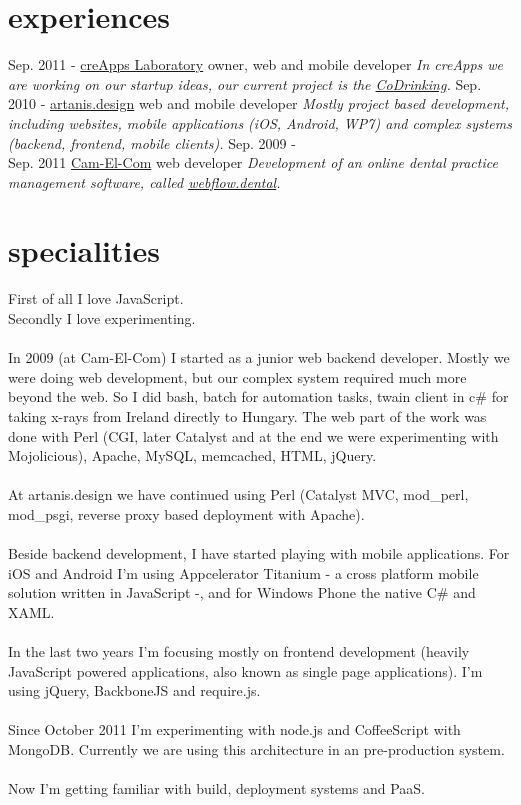 \documentclass[]{k-cv}
\begin{document}
\section{experiences}

\begin{entrylist}
	\entry
		{Sep. 2011 - }
		{\href{http://creapps.net}{creApps Laboratory}}
		{owner, web and mobile developer}
		{\emph{In creApps we are working on our startup ideas, our current project is the \href{http://codrinking.net}{CoDrinking}.}}
	\entry
		{Sep. 2010 - }
		{\href{http://artanisdesign.eu/}{artanis.design}}
		{web and mobile developer}
		{\emph{Mostly project based development, including websites, mobile applications (iOS, Android, WP7) and complex systems (backend, frontend, mobile clients).}}
	\entry
		{Sep. 2009 -\\ Sep. 2011}
		{\href{http://camelcom.hu}{Cam-El-Com}}
		{web developer}
		{\emph{Development of an online dental practice management software, called \href{http://webflow-dental.com/}{webflow.dental}.}}
\end{entrylist}

\section{specialities}
First of all I love JavaScript.\\
Secondly I love experimenting.\\
\\
In 2009 (at Cam-El-Com) I started as a junior web backend developer. Mostly we were doing web development, but our complex system required much more beyond the web. So I did bash, batch for automation tasks, twain client in c\# for taking x-rays from Ireland directly to Hungary. The web part of the work was done with Perl (CGI, later Catalyst and at the end we were experimenting with Mojolicious), Apache, MySQL, memcached, HTML, jQuery.\\
\\
At artanis.design we have continued using Perl (Catalyst MVC, mod\_perl, mod\_psgi, reverse proxy based deployment with Apache).\\
\\
Beside backend development, I have started playing with mobile applications. For iOS and Android I'm using Appcelerator Titanium - a cross platform mobile solution written in JavaScript -, and for Windows Phone the native C\# and XAML.\\
\\
In the last two years I'm focusing mostly on frontend development (heavily JavaScript powered applications, also known as single page applications). I'm using jQuery, BackboneJS and require.js.\\
\\
Since October 2011 I'm experimenting with node.js and CoffeeScript with MongoDB. Currently we are using this architecture in an pre-production system.\\
\\
Now I'm getting familiar with build, deployment systems and PaaS.\\
\end{document}
